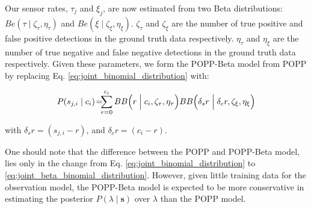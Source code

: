 
Our sensor rates, $\tau_j$ and $\xi_j$, are now estimated from two Beta distributions: $Be(\tau \mid \zeta_{\tau}, \eta_{\tau})$ and $Be(\xi \mid \zeta_{\xi}, \eta_{\xi})$.
% 
$\zeta_{\tau}$ and $\zeta_{\xi}$ are the number of true positive and false positive detections in the ground truth data respectively.
% 
$\eta_{\tau}$ and $\eta_{\xi}$ are the number of true negative and false  negative detections in the ground truth data respectively. 
% 
Given these parameters, we form the POPP-Beta model from POPP by replacing Eq. \ref{eq:joint_binomial_distribution} with:  

\begin{equation}
	\label{eq:joint_beta_binomial_distribution}
    P(s_{j,i} \mid c_i) \! = \! \! \! \displaystyle\sum_{r = 0}^{c_{i}} \! \! ~ BB\Big(r \Bigm| c_i, \zeta_{\tau}, \eta_{\tau} \Big) BB\Big( \delta_s r \Bigm| \delta_c r, \zeta_{\xi}, \eta_{\xi} \Big)
\end{equation}

\noindent with $\delta_s r = (s_{j,i} - r)$, and $\delta_c r = (c_i - r)$.

One should note that the difference between the POPP and POPP-Beta model, lies only in the change from Eq. \ref{eq:joint_binomial_distribution} to \ref{eq:joint_beta_binomial_distribution}. However, given little training data for the observation model, the POPP-Beta model is expected to be more conservative in estimating the posterior $P(\lambda \mid \mathbf{s})$ over $\lambda$ than the POPP model. 

